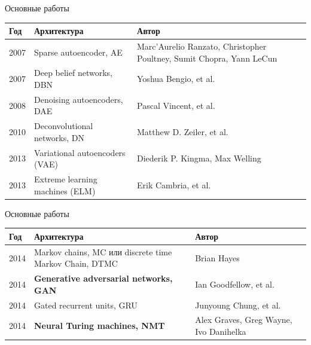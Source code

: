 \documentclass{beamer}
\begin{document}
\begin{frame}{Основные работы}
\begin{center}
\begin{tabular}{|p{0.4in}|p{1.5in}|p{1.3in}|}\hline
\textbf{Год}& \textbf{Архитектура} & \textbf{Автор} \\
\hline
2007 & \textsf{Sparse autoencoder, AE} & Marc’Aurelio Ranzato, Christopher Poultney, Sumit Chopra, Yann LeCun \\\hline
2007 & \textsf{Deep belief networks, DBN} & Yoshua Bengio, et al. \\\hline
2008 & \textsf{Denoising autoencoders, DAE} & Pascal Vincent, et al. \\\hline
2010 & \textsf{Deconvolutional networks, DN} & Matthew D. Zeiler, et al. \\\hline
2013 & \textsf{Variational autoencoders (VAE)} & Diederik P. Kingma, Max Welling \\\hline
2013 & \textsf{Extreme learning machines (ELM)} & Erik Cambria, et al. \\\hline
\end{tabular}
\end{center}
\end{frame}

\begin{frame}{Основные работы}
\begin{center}
\begin{tabular}{|p{0.4in}|p{1.5in}|p{1.3in}|}\hline
\textbf{Год}& \textbf{Архитектура} & \textbf{Автор} \\
\hline
2014 & \textsf{Markov chains, MC или discrete time Markov Chain, DTMC} & Brian Hayes \\\hline
2014 & \textbf{Generative adversarial networks, GAN} & Ian Goodfellow, et al. \\\hline
2014 & \textsf{Gated recurrent units, GRU} & Junyoung Chung, et al. \\\hline
2014 & \textbf{Neural Turing machines, NMT} & Alex Graves, Greg Wayne, Ivo Danihelka \\\hline
\end{tabular}
\end{center}
\end{frame}
\end{document}
